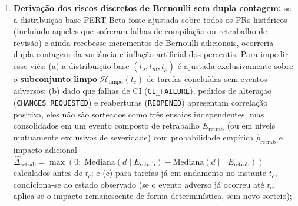 \documentclass[12pt,openany,oneside,a4paper,english,brazilian,sumario=tradicional]{abntex2}
\begin{document}
\begin{enumerate}
\begin{itemize}
  \end{itemize}
  Ressalta-se que, como toda distribuição Beta possui suporte compacto $[t_o, t_p]$, a parametrização Nível 1 ou Nível 2 reduz mas não elimina a possibilidade de observações futuras acima de $t_p$ (truncamento residual na cauda extrema). Para evitar instabilidade em classes com poucos itens, exige-se tamanho amostral mínimo $n_{\text{classe}} \ge 15$ itens concluídos por rótulo; classes com $n_{\text{classe}} < 15$ sofrem agrupamento hierárquico (\textit{shrinkage}) para o conjunto histórico global ($n_{\text{global}} \ge 30$). A aderência empírica é avaliada pela distância $D_n$, gráficos quantil-quantil (QQ-\textit{plots}) e \textit{bootstrap} paramétrico ($B=1.000$), sem usar $p$-valores assintóticos de KS sobre parâmetros estimados da mesma amostra;
  \item \textbf{Derivação dos riscos discretos de Bernoulli sem dupla contagem:} se a distribuição base PERT-Beta fosse ajustada sobre todos os PRs históricos (incluindo aqueles que sofreram falhas de compilação ou retrabalho de revisão) e ainda recebesse incrementos de Bernoulli adicionais, ocorreria dupla contagem da variância e inflação artificial dos percentis. Para impedir esse viés: (a) a distribuição base $(t_o, t_m, t_p)$ é ajustada exclusivamente sobre o \textbf{subconjunto limpo} $\mathcal{H}_{\text{limpo}}(t_c)$ de tarefas concluídas sem eventos adversos; (b) dado que falhas de CI (\texttt{CI\_FAILURE}), pedidos de alteração (\texttt{CHANGES\_REQUESTED}) e reaberturas (\texttt{REOPENED}) apresentam correlação positiva, eles não são sorteados como três ensaios independentes, mas consolidados em um evento composto de retrabalho $E_{\text{retrab}}$ (ou em níveis mutuamente exclusivos de severidade) com probabilidade empírica $\hat{p}_{\text{retrab}}$ e impacto adicional $\hat{\Delta}_{\text{retrab}} = \max(0;\; \mathrm{Mediana}(d \mid E_{\text{retrab}}) - \mathrm{Mediana}(d \mid \neg E_{\text{retrab}}))$ calculados antes de $t_c$; e (c) para tarefas já em andamento no instante $t_c$, condiciona-se ao estado observado (se o evento adverso já ocorreu até $t_c$, aplica-se o impacto remanescente de forma determinística, sem novo sorteio);

\end{enumerate}
\end{document}
